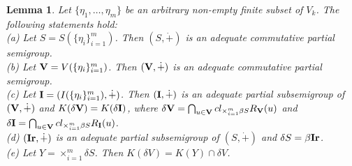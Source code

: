 \documentclass{amsart}
\newtheorem{lemma}[theorem]{Lemma}
\theoremstyle{definition}
\theoremstyle{remark}
\numberwithin{equation}{section}
\newcommand{\Ir}{{\bf{Ir}}}
\newcommand{\V}{{\bf{V}}}
\newcommand{\I}{{\bf{I}}}
\begin{document}
\begin{lemma}{\label{asli}}
	Let $\{\eta_1,\ldots,\eta_m\}$ be an arbitrary non-empty finite subset of $V_k$. The following statements hold:\\
	(a) Let $S=S(\{\eta_i\}_{i=1}^m)$. Then $(S,\dot{+})$ is an adequate commutative partial semigroup.\\
	(b) Let $\V=V(\{\eta_i\}_{i=1}^m)$. Then $(\V,\dot{+})$ is an  adequate commutative partial semigroup.\\
	(c) Let $\I=(I(\{\eta_i\}_{i=1}^m),\dot{+})$. Then $(\I,\dot{+})$ is an adequate partial subsemigroup of $(\V,\dot{+})$ and $K(\delta \V)=K(\delta\I)$, where $\delta \V=\bigcap_{u\in \V}cl_{\times_{i=1}^m\beta S}R_\V(u)$ and $\delta \I=\bigcap_{u\in \V}cl_{\times_{i=1}^m\beta S}R_\I(u)$. \\
	(d) $(\Ir,\dot{+})$ is an adequate partial subsemigroup of $(S,\dot{+})$ and $\delta S=\beta \Ir$.\\
	(e) Let $Y=\times_{i=1}^m\delta S$. Then $K(\delta V)=K(Y)\cap \delta V$.
\end{lemma}
\end{document}
